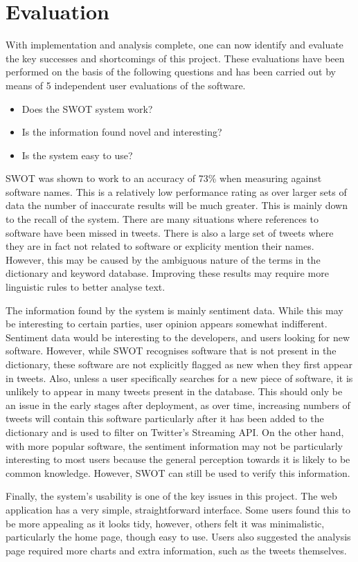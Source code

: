 \chapter{Evaluation}
\label{cha:eval}
With implementation and analysis complete, one can now identify and evaluate the key successes and shortcomings of this project. These evaluations have been performed on the basis of the following questions and has been carried out by means of 5 independent user evaluations of the software.

\begin{itemize}
\item Does the SWOT system work?
\item Is the information found novel and interesting?
\item Is the system easy to use?
\end{itemize}

SWOT was shown to work to an accuracy of 73\% when measuring against software names. This is a relatively low performance rating as over larger sets of data the number of inaccurate results will be much greater. This is mainly down to the recall of the system. There are many situations where references to software have been missed in tweets. There is also a large set of tweets where they are in fact not related to software or explicity mention their names. However, this may be caused by the ambiguous nature of the terms in the dictionary and keyword database. Improving these results may require more linguistic rules to better analyse text.

The information found by the system is mainly sentiment data. While this may be interesting to certain parties, user opinion appears somewhat indifferent. Sentiment data would be interesting to the developers, and users looking for new software. However, while SWOT recognises software that is not present in the dictionary, these software are not explicitly flagged as new when they first appear in tweets. Also, unless a user specifically searches for a new piece of software, it is unlikely to appear in many tweets present in the database. This should only be an issue in the early stages after deployment, as over time, increasing numbers of tweets will contain this software particularly after it has been added to the dictionary and is used to filter on Twitter's Streaming API.  On the other hand, with more popular software, the sentiment information may not be particularly interesting to most users because the general perception towards it is likely to be common knowledge. However, SWOT can still be used to verify this information.

Finally, the system's usability is one of the key issues in this project. The web application has a very simple, straightforward interface. Some users found this to be more appealing as it looks tidy, however, others felt it was minimalistic, particularly the home page, though easy to use. Users also suggested the analysis page required more charts and extra information, such as the tweets themselves.

